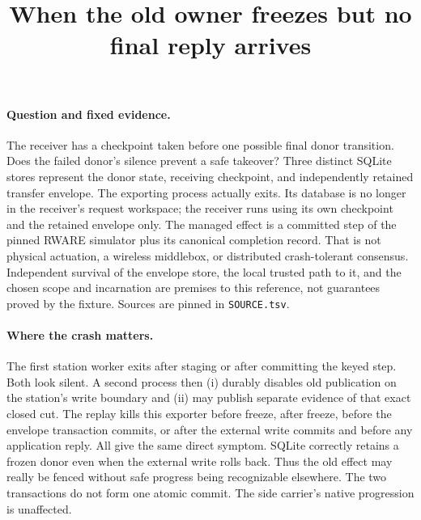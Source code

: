 \documentclass{article}
\title{When the old owner freezes but no final reply arrives}
\date{}
\begin{document}
\maketitle

\paragraph{Question and fixed evidence.}
The receiver has a checkpoint taken before one possible final donor
transition. Does the failed donor's silence prevent a safe takeover?
Three distinct SQLite stores represent the donor state, receiving
checkpoint, and independently retained transfer envelope. The
exporting process actually exits. Its database is no longer in the
receiver's request workspace; the receiver runs using its own
checkpoint and the retained envelope only. The managed effect is a
committed step of the pinned RWARE simulator plus its canonical
completion record. That is not physical actuation, a wireless middlebox,
or distributed crash-tolerant consensus. Independent survival of the
envelope store, the local trusted path to it, and the chosen scope and
incarnation are premises to this reference, not guarantees proved by
the fixture. Sources are pinned in \verb|SOURCE.tsv|.

\paragraph{Where the crash matters.}
The first station worker exits after staging or after committing the
keyed step. Both look silent. A second process then (i) durably
disables old publication on the station's write boundary and (ii)
may publish separate evidence of that exact closed cut. The replay
kills this exporter before freeze, after freeze, before the envelope
transaction commits, or after the external write commits and before
any application reply. All give the same direct symptom. SQLite
correctly retains a frozen donor even when the external write rolls
back. Thus the old effect may really be fenced without safe progress
being recognizable elsewhere. The two transactions do not form one
atomic commit. The side carrier's native progression is unaffected.
\end{document}
